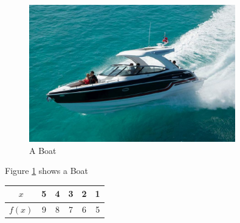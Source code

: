 \documentclass[12pt]{article}
\begin{document}
\begin{figure}
\includegraphics[width=0.8\textwidth]{boat.jpg}
\caption{A Boat}
\label{fig:girl}
\end{figure}
Figure \ref{fig:girl} shows a Boat
\newpage
\begin{tabular}{|c||c|c|c|c|c|}
\hline
$x$ & 5 & 4 & 3 & 2 & 1 \\ \hline
$f(x)$ & 9 & 8 & 7 & 6 & 5\\ \hline

\end{tabular}
\end{document}
